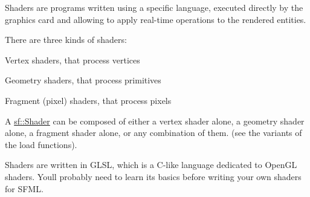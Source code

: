 Shaders are programs written using a specific language, executed directly by the graphics card and allowing to apply real-\/time operations to the rendered entities.

There are three kinds of shaders\+: \begin{DoxyItemize}
\item Vertex shaders, that process vertices \item Geometry shaders, that process primitives \item Fragment (pixel) shaders, that process pixels\end{DoxyItemize}
A \hyperlink{classsf_1_1_shader}{sf\+::\+Shader} can be composed of either a vertex shader alone, a geometry shader alone, a fragment shader alone, or any combination of them. (see the variants of the load functions).

Shaders are written in G\+L\+SL, which is a C-\/like language dedicated to Open\+GL shaders. You\textquotesingle{}ll probably need to learn its basics before writing your own shaders for S\+F\+ML.

